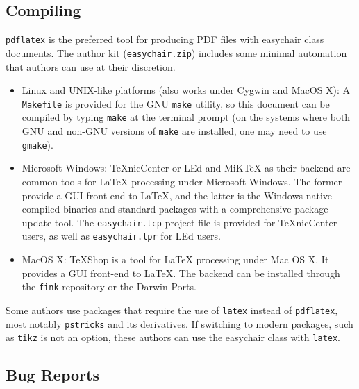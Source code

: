 \documentclass[EPiC]{easychair}
\newcommand{\easychair}{\textsf{easychair}}
\newcommand{\miktex}{MiK{\TeX}}
\newcommand{\texniccenter}{{\TeX}nicCenter}
\newcommand{\makefile}{\texttt{Makefile}}
\newcommand{\latexeditor}{LEd}
\begin{document}
\subsection{Compiling}
\label{sect:compiling}

\texttt{pdflatex} \cite{pdflatex-instructions} is the preferred tool for
producing PDF files with {\easychair} class documents.
The author kit (\texttt{easychair.zip}) includes some minimal automation 
that authors can use at their discretion.

\begin{itemize}
\item
Linux and UNIX-like platforms (also works under Cygwin and MacOS X):
A {\makefile} is provided for the GNU \texttt{make} \cite{gmake} utility,
so this document can be compiled by typing \texttt{make} at the terminal 
prompt (on the systems where both GNU and non-GNU versions of \texttt{make} 
are installed, one may need to use \texttt{gmake}).

\item
Microsoft Windows:
{\texniccenter} \cite{texniccenter} or {\latexeditor} \cite{led} and
{\miktex} \cite{miktex} as their backend are common tools
for {\LaTeX} processing under Microsoft Windows. 
The former provide a GUI front-end to {\LaTeX}, and the latter is the 
Windows native-compiled binaries and standard packages with 
a comprehensive package update tool. 
The \texttt{easychair.tcp} project file is provided for {\texniccenter} users,
as well as \texttt{easychair.lpr} for {\latexeditor} users.

\item
MacOS X:
TeXShop \cite{texshop} is a tool for {\LaTeX} processing under Mac OS X.
It provides a GUI front-end to {\LaTeX}. The backend can be installed
through the \texttt{fink} \cite{fink} repository or the Darwin Ports.
\end{itemize}

Some authors use packages that require the use of \texttt{latex}
instead of \texttt{pdflatex}, most notably \texttt{pstricks} and its
derivatives. If switching to modern packages, such as
\texttt{tikz} is not an option, these authors can use the {\easychair}
class with \texttt{latex}. 

\subsection{Bug Reports}
\label{sec:bug-reports}
\end{document}
